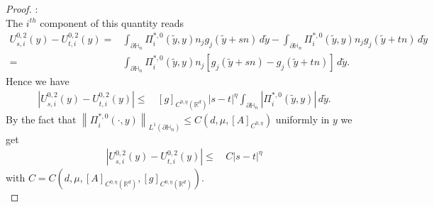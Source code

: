 \documentclass[11pt, reqno]{amsart}
\theoremstyle{definition}
\theoremstyle{remark}
\numberwithin{equation}{section}
\begin{document}
\begin{proof}[Proof]
		:\\
		The $i^{th}$ component of  this quantity reads
		\begin{align*}
			U_{s,i}^{0,2}(y)- U_{t,i}^{0,2}(y)	=&  \int_{\partial\mathbb{H}_n}   \Pi_i^{*,0}(\tilde{y}, y) n_j g_j(\tilde{y}+sn)\,d\tilde{y} - \int_{\partial\mathbb{H}_n}   \Pi_i^{*,0}(\tilde{y}, y) n_j g_j(\tilde{y}+tn)\,d\tilde{y}\\
			=&\int_{\partial\mathbb{H}_n}   \Pi_i^{*,0}(\tilde{y}, y) n_j [g_j(\tilde{y}+sn)- g_j(\tilde{y}+tn)]\,d\tilde{y}.
		\end{align*}
		Hence 		we have 
		\begin{align*}
			|	U_{s,i}^{0,2}(y)- U_{t,i}^{0,2}(y)|	\leq &  \, [g]_{C^{0,\eta}(\mathbb{R}^d)}|s-t|^\eta
			\int_{\partial\mathbb{H}_n}  | \Pi_i^{*,0}(\tilde{y}, y)|\,d\tilde{y}.
		\end{align*}		
		\noindent By  the fact that
		$	\left\|\Pi^{*,0}_i\left(\cdot,y \right)\right\|_{ L^1(\partial\mathbb{H}_n)}\leq C(d, \mu, [A]_{C^{0,\eta}})
		$ uniformly in $y$
		we get
		\begin{align}
			|	U_{s,i}^{0,2}(y)- U_{t,i}^{0,2}(y)|	\leq &  \, C|s-t|^\eta	\nonumber
		\end{align}with $C=C\left(d, \mu, [A]_{C^{0,\eta}(\mathbb{R}^d)}, [g]_{C^{0,\eta}(\mathbb{R}^d) }  \right).$\\
		

\end{proof}
\end{document}
